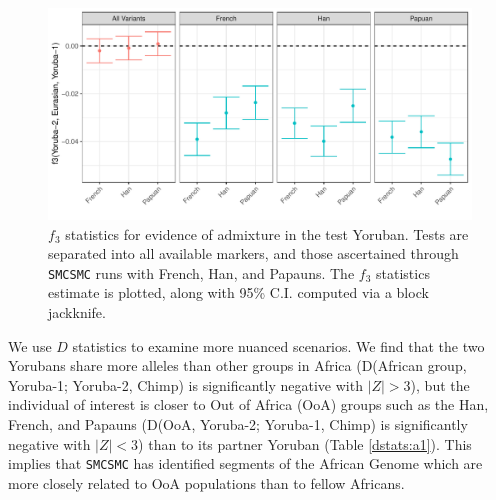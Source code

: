\documentclass{article}
\begin{document}
\begin{figure}
    \centering
    \includegraphics[width=\textwidth]{plot/f3_admix.pdf}
    \caption{$f_3$ statistics for evidence of admixture in the test Yoruban. Tests are separated into all available markers, and those ascertained through {\tt SMCSMC} runs with French, Han, and Papauns. The $f_3$ statistics estimate is plotted, along with 95\% C.I. computed via a block jackknife.}
    \label{fig:f3_admix}
\end{figure}


We use $D$ statistics to examine more nuanced scenarios. We find that the two Yorubans share more alleles than other groups in Africa (D(African group, Yoruba-1; Yoruba-2, Chimp) is significantly negative with $|Z|>3$), but the individual of interest is closer to Out of Africa (OoA) groups such as the Han, French, and Papauns (D(OoA, Yoruba-2; Yoruba-1, Chimp) is significantly negative with $|Z|<3$) than to its partner Yoruban (Table \ref{dstats:a1}). This implies that {\tt SMCSMC} has identified segments of the African Genome which are more closely related to OoA populations than to fellow Africans.   
\end{document}
